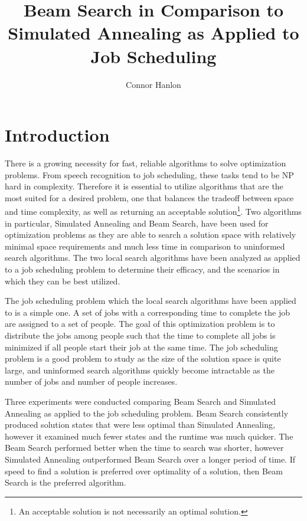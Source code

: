 \documentclass[10pt, twocolumn]{article}
\title{\vspace{-2.0cm} Beam Search in Comparison to Simulated Annealing as Applied to Job Scheduling}
\author{Connor Hanlon}
\begin{document}
\maketitle

\section{Introduction}

There is a growing necessity for fast, reliable algorithms to solve optimization problems. From speech recognition to job scheduling, these tasks tend to be NP hard in complexity. Therefore it is essential to utilize algorithms that are the most suited for a desired problem, one that balances the tradeoff between space and time complexity, as well as returning an acceptable solution\footnote{An acceptable solution is not necessarily an optimal solution.}. Two algorithms in particular, Simulated Annealing and Beam Search, have been used for optimization problems as they are able to search a solution space with relatively minimal space requirements and much less time in comparison to uninformed search algorithms. The two local search algorithms have been analyzed as applied to a job scheduling problem to determine their efficacy, and the scenarios in which they can be best utilized.

The job scheduling problem which the local search algorithms have been applied to is a simple one. A set of jobs with a corresponding time to complete the job are assigned to a set of people. The goal of this optimization problem is to distribute the jobs among people such that the time to complete all jobs is minimized if all people start their job at the same time. The job scheduling problem is a good problem to study as the size of the solution space is quite large, and uninformed search algorithms quickly become intractable as the number of jobs and number of people increases.


Three experiments were conducted comparing Beam Search and Simulated Annealing as applied to the job scheduling problem. Beam Search consistently produced solution states that were less optimal than Simulated Annealing, however it examined much fewer states and the runtime was much quicker. The Beam Search performed better when the time to search was shorter, however Simulated Annealing outperformed Beam Search over a longer period of time. If speed to find a solution is preferred over optimality of a solution, then Beam Search is the preferred algorithm.
\end{document}
